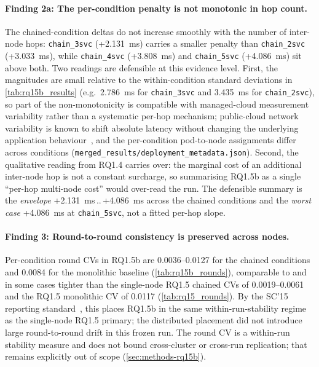 \paragraph{Finding 2a: The per-condition penalty is not monotonic in hop count.}
The chained-condition deltas do not increase smoothly with the number of
inter-node hops: \texttt{chain\_3svc} (+2.131~ms) carries a smaller
penalty than \texttt{chain\_2svc} (+3.033~ms), while \texttt{chain\_4svc}
(+3.808~ms) and \texttt{chain\_5svc} (+4.086~ms) sit above both. Two
readings are defensible at this evidence level. First, the magnitudes are
small relative to the within-condition standard deviations in
\cref{tab:rq15b_results} (e.g.\ 2.786~ms for \texttt{chain\_3svc} and
3.435~ms for \texttt{chain\_2svc}), so part of the non-monotonicity is
compatible with managed-cloud measurement variability rather than a
systematic per-hop mechanism; public-cloud network variability is known
to shift absolute latency without changing the underlying application
behaviour~\cite{noise_in_clouds,noisy_neighbor_k8s}, and the
per-condition pod-to-node assignments differ across conditions
(\texttt{merged\_results/deployment\_metadata.json}). Second, the
qualitative reading from RQ1.4 carries over: the marginal cost of an
additional inter-node hop is not a constant surcharge, so summarising
RQ1.5b as a single ``per-hop multi-node cost'' would over-read the run.
The defensible summary is the \emph{envelope}
+2.131~ms\,..\,+4.086~ms across the chained conditions and the
\emph{worst case} +4.086~ms at \texttt{chain\_5svc}, not a fitted
per-hop slope.

\paragraph{Finding 3: Round-to-round consistency is preserved across nodes.}
Per-condition round CVs in RQ1.5b are 0.0036--0.0127 for the chained
conditions and 0.0084 for the monolithic baseline
(\cref{tab:rq15b_rounds}), comparable to and in some cases tighter than
the single-node RQ1.5 chained CVs of 0.0019--0.0061 and the RQ1.5
monolithic CV of 0.0117 (\cref{tab:rq15_rounds}). By the SC'15 reporting
standard~\cite{benchmarking_sc15}, this places RQ1.5b in the same
within-run-stability regime as the single-node RQ1.5 primary; the
distributed placement did not introduce large round-to-round drift in
this frozen run. The round CV is a within-run stability measure and does
not bound cross-cluster or cross-run replication; that remains explicitly
out of scope (\cref{sec:methods-rq15b}).

